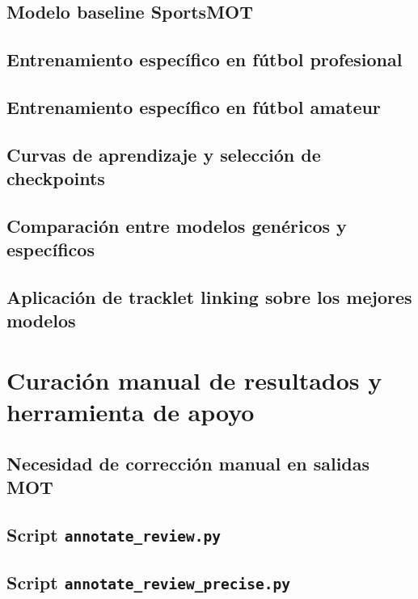 \documentclass[12pt, a4paper, twoside]{article}
\begin{document}
	\subsection{Modelo baseline SportsMOT}
	\subsection{Entrenamiento específico en fútbol profesional}
	\subsection{Entrenamiento específico en fútbol amateur}
	\subsection{Curvas de aprendizaje y selección de checkpoints}
	\subsection{Comparación entre modelos genéricos y específicos}
	\subsection{Aplicación de tracklet linking sobre los mejores modelos}
	
	\newpage
	
	
	\section{Curación manual de resultados y herramienta de apoyo}
	
	\subsection{Necesidad de corrección manual en salidas MOT}
	\subsection{Script \texttt{annotate\_review.py}}
	\subsection{Script \texttt{annotate\_review\_precise.py}}
\end{document}

